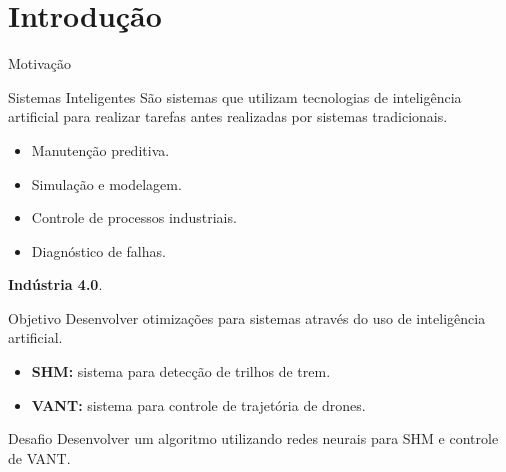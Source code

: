 \section{Introdução}
\begin{frame}{Motivação}
\begin{block}{Sistemas Inteligentes}
    São sistemas que utilizam tecnologias de inteligência artificial para realizar tarefas antes realizadas por sistemas tradicionais.    
\end{block}
\vfill
\begin{itemize}
    \item Manutenção preditiva.
    \item Simulação e modelagem.
    \item Controle de processos industriais.
    \item Diagnóstico de falhas.
\end{itemize} \pause
\vfill
\textbf{Indústria 4.0}.
\end{frame}
\begin{frame}{Objetivo}
Desenvolver otimizações para sistemas através do uso de inteligência artificial. \pause
\vfill
\begin{itemize}
    \item \textbf{SHM:} sistema para detecção de trilhos de trem. 
    \item \textbf{VANT:} sistema para controle de trajetória de drones.
\end{itemize} \pause
\vfill
\begin{block}{Desafio}
    Desenvolver um algoritmo utilizando redes neurais para SHM e controle de VANT.
\end{block}
\end{frame} 




